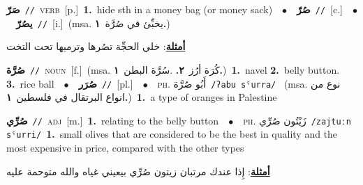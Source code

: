 \documentclass[10pt,a4paper,twoside]{article} %
\begin{document}
\begin{multicols}{2}
{\setlength\topsep{0pt}\textbf{\foreignlanguage{arabic}{صَرّ}}\ {\color{gray}\texttt{//}\color{black}}\ \textsc{verb}\ [p.]\ \textbf{1.}~hide sth in a money bag (or money sack)\ \ $\bullet$\ \ \setlength\topsep{0pt}\textbf{\foreignlanguage{arabic}{صُرّ}}\ {\color{gray}\texttt{//}\color{black}}\ [c.]\ \ $\bullet$\ \ \setlength\topsep{0pt}\textbf{\foreignlanguage{arabic}{يصُرّ}}\ {\color{gray}\texttt{//}\color{black}}\ [i.]\ \color{gray}(msa. \foreignlanguage{arabic}{يخبِّئ في صُرَّة}~\foreignlanguage{arabic}{\textbf{١.}})\color{black}\  \begin{flushright}\color{gray}\foreignlanguage{arabic}{\textbf{\underline{\foreignlanguage{arabic}{أمثلة}}}: خلي الحجِّة تصُرها وترميها تحت التخت}\end{flushright}\color{black}} \vspace{2mm}

{\setlength\topsep{0pt}\textbf{\foreignlanguage{arabic}{صُرَّة}}\ {\color{gray}\texttt{//}\color{black}}\ \textsc{noun}\ [f.]\ \color{gray}(msa. \foreignlanguage{arabic}{كُرَة أرُز}~\foreignlanguage{arabic}{\textbf{٢.}}  .\foreignlanguage{arabic}{سُرَّة البطن}~\foreignlanguage{arabic}{\textbf{١.}})\color{black}\ \textbf{1.}~navel  \textbf{2.}~belly button.  \textbf{3.}~rice ball\ \ $\bullet$\ \ \setlength\topsep{0pt}\textbf{\foreignlanguage{arabic}{صُرَر}}\ {\color{gray}\texttt{//}\color{black}}\ [pl.]\ \ $\bullet$\ \ \textsc{ph.} \color{gray} \foreignlanguage{arabic}{أَبُو صُرَّة}\color{black}\ {\color{gray}\texttt{/{\sffamily ʔabu sˤurra}/}\color{black}}\ \color{gray} (msa. \foreignlanguage{arabic}{نوع من انواع البرتقال في فلسطين}~\foreignlanguage{arabic}{\textbf{١.}})\color{black}\ \textbf{1.}~a type of oranges in Palestine\ } \vspace{2mm}

{\setlength\topsep{0pt}\textbf{\foreignlanguage{arabic}{صُرِّي}}\ {\color{gray}\texttt{//}\color{black}}\ \textsc{adj}\ [m.]\ \textbf{1.}~relating to the belly button\ \ $\bullet$\ \ \textsc{ph.} \color{gray} \foreignlanguage{arabic}{زَيْتُون صُرِّي}\color{black}\ {\color{gray}\texttt{/{\sffamily zajtuːn sˤurri}/}\color{black}}\ \textbf{1.}~small olives that are considered to be the best in quality and the most expensive in price, compared with the other types\  \begin{flushright}\color{gray}\foreignlanguage{arabic}{\textbf{\underline{\foreignlanguage{arabic}{أمثلة}}}: إِذا عندك مرتبان زيتون صُرِّي بيعيني غياه والله متوحمة عليه}\end{flushright}\color{black}} \vspace{2mm}


\end{multicols}
\end{document}
